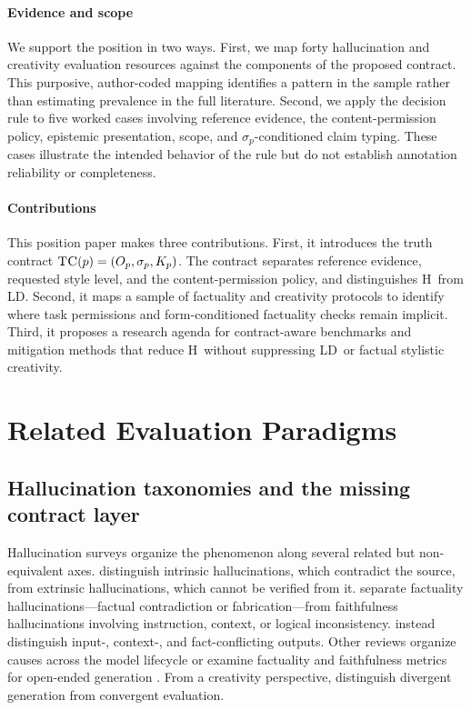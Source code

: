 \documentclass{clv2025}
\newcommand{\TC}{\textsc{TC}}
\newcommand{\LD}{\textsc{LD}}
\newcommand{\Hall}{\textsc{H}}
\begin{document}
\paragraph{Evidence and scope}
We support the position in two ways.
First, we map forty hallucination and creativity evaluation resources against the components of the proposed contract.
This purposive, author-coded mapping identifies a pattern in the sample rather than estimating prevalence in the full literature.
Second, we apply the decision rule to five worked cases involving reference evidence, the content-permission policy, epistemic presentation, scope, and $\sigma_p$-conditioned claim typing.
These cases illustrate the intended behavior of the rule but do not establish annotation reliability or completeness.

\paragraph{Contributions}
This position paper makes three contributions.
First, it introduces the truth contract $\TC(p)=(O_p,\sigma_p,K_p)$.
The contract separates reference evidence, requested style level, and the content-permission policy, and distinguishes \Hall\ from \LD.
Second, it maps a sample of factuality and creativity protocols to identify where task permissions and form-conditioned factuality checks remain implicit.
Third, it proposes a research agenda for contract-aware benchmarks and mitigation methods that reduce \Hall\ without suppressing \LD\ or factual stylistic creativity.

\section{Related Evaluation Paradigms}\label{sec:related}

\subsection{Hallucination taxonomies and the missing contract layer}

Hallucination surveys organize the phenomenon along several related but non-equivalent axes.
\citet{ji_survey_2023} distinguish intrinsic hallucinations, which contradict the source, from extrinsic hallucinations, which cannot be verified from it.
\citet{huang_survey_2025} separate factuality hallucinations---factual contradiction or fabrication---from faithfulness hallucinations involving instruction, context, or logical inconsistency.
\citet{zhang_sirens_2025} instead distinguish input-, context-, and fact-conflicting outputs.
Other reviews organize causes across the model lifecycle or examine factuality and faithfulness metrics for open-ended generation \citep{wang_factuality_survey_2024,malin_faithfulness_review_2025,lamba_lifecycle_2026}.
From a creativity perspective, \citet{jiang_survey_2024} distinguish divergent generation from convergent evaluation.
\end{document}
